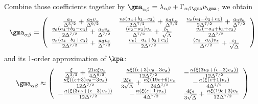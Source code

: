 \documentclass[fleqn,10pt]{InternshipReport_SI-ENS-PSL}
\begin{document}
Combine those coefficients together by $\gma_{\ab} = \lambda_{\ab} + \Gamma_{\ab\gma} v_\gma$, we obtain
$$ \gma_{\ab} = \left(
\begin{array}{ccc}
 \frac{a_1}{\Delta ^{3/2}}+\frac{a_2 v_z}{\Delta ^{9/2}} & \frac{v_{\theta } \left(a_4+b_3-c_3\right)}{2 \Delta ^{7/2}}+\frac{a_3 v_x}{\Delta ^{7/2}} & \frac{v_x \left(a_4-b_3+c_3\right)}{2 \Delta ^{7/2}}+\frac{a_3 v_{\theta }}{\Delta ^{7/2}} \\
 \frac{v_{\theta } \left(a_4+b_3-c_3\right)}{2 \Delta ^{7/2}}+\frac{a_3 v_x}{\Delta ^{7/2}} & \frac{\left(b_2-a_3\right) v_z}{\Delta ^{7/2}}+\frac{b_1}{\sqrt{\Delta }} & \frac{v_z \left(-a_4+b_3+c_3\right)}{2 \Delta ^{7/2}} \\
 \frac{v_x \left(a_4-b_3+c_3\right)}{2 \Delta ^{7/2}}+\frac{a_3 v_{\theta }}{\Delta ^{7/2}} & \frac{v_z \left(-a_4+b_3+c_3\right)}{2 \Delta ^{7/2}} & \frac{\left(c_2-a_3\right) v_z}{\Delta ^{7/2}}+\frac{c_1}{\sqrt{\Delta }} \\
\end{array}
\right)$$
and its 1-order approximation of $\kpa$:
$$ \gma_{\ab} \approx \left(
\begin{array}{ccc}
 \frac{\xi }{\Delta ^{3/2}}+\frac{21 \kappa  \xi  v_z}{4 \Delta ^{9/2}} & \frac{\kappa  \xi  \left((\epsilon +3) v_{\theta }-3 v_x\right)}{12 \Delta ^{7/2}} & -\frac{\kappa  \left(\xi  \left(3 v_{\theta }+(\epsilon -3) v_x\right)\right)}{12 \Delta ^{7/2}} \\
 \frac{\kappa  \xi  \left((\epsilon +3) v_{\theta }-3 v_x\right)}{12 \Delta ^{7/2}} & \frac{2 \xi  \epsilon }{3 \sqrt{\Delta }}+\frac{\kappa  \xi  (19 \epsilon +6) v_z}{24 \Delta ^{7/2}} & -\frac{\kappa  \left(\xi  (\epsilon +1) v_z\right)}{4 \Delta ^{7/2}} \\
 -\frac{\kappa  \left(\xi  \left(3 v_{\theta }+(\epsilon -3) v_x\right)\right)}{12 \Delta ^{7/2}} & -\frac{\kappa  \left(\xi  (\epsilon +1) v_z\right)}{4 \Delta ^{7/2}} & \frac{4 \xi  \epsilon }{3 \sqrt{\Delta }}+\frac{\kappa  \xi  (19 \epsilon +3) v_z}{12 \Delta ^{7/2}} \\
\end{array}
\right) $$
\end{document}
